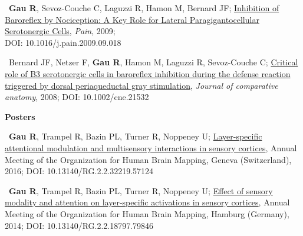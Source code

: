 \documentclass[a4paper,12pt,oneside]{letter}
\begin{document}
{\textbullet~\textbf{Gau R}, Sevoz-Couche C, Laguzzi R, Hamon M, Bernard JF; \href{http://www.researchgate.net/profile/Remi_Gau/publication/38057329_Inhibition_of_cardiac_baroreflex_by_noxious_thermal_stimuli_A_key_role_for_lateral_paragigantocellular_serotonergic_cells/links/586bf90d08ae8fce4919e188.pdf}{Inhibition of Baroreflex by Nociception: A Key Role for Lateral Paragigantocellular Serotonergic Cells}, \textit{Pain}, 2009; \\DOI: 10.1016/j.pain.2009.09.018

\textbullet~Bernard JF, Netzer F, \textbf{Gau R}, Hamon M, Laguzzi R, Sevoz-Couche C; 
\href{http://www.researchgate.net/profile/Remi_Gau/publication/5856955_Critical_role_of_B3_serotonergic_cells_in_baroreflex_inhibition_during_the_defense_reaction_triggered_by_dorsal_periaqueductal_gray_stimulation/links/586bf81d08ae6eb871bb6f47.pdf}{Critical role of B3 serotonergic cells in baroreflex inhibition during the defense reaction triggered by dorsal periaqueductal gray stimulation}, \textit{Journal of comparative anatomy}, 2008; DOI: 10.1002/cne.21532


\begin{center}
\Large\textbf{Posters}
\end{center}

\textbullet~\textbf{Gau R}, Trampel R, Bazin PL, Turner R, Noppeney U; \href{http://www.researchgate.net/profile/Remi_Gau/publication/312040907_Layer-specific_attentional_modulation_and_multisensory_interactions_in_sensory_cortices/links/586bec8108ae8fce4919e07e.pdf?origin=publication_detail&ev=pub_int_prw_xdl&msrp=ebfE-ttTbrYfVzAofje5aX7FDjiW85HC3yqk8seJjhsOoLqmeRviQBtfDuXmv_czDArKxDp2vM32swxlbQzyvbVTbKL6xRpsEZ-BeqgslOo.KWD8vv500DrprbLnXSrDxinWDQrliScdbic1rjyyqLUG12KOwbjri9jbFDwSYWMkGLoSocKyAei7eQLoDCU9Dw.4eQVGmpcVG-AAQDI4KiYt-xA9SDkF_u7xvWOznoi52trnfagq5aJVIAgpfhgitdzt3LYuUPdJ8gE6jmG5I94Nw}{Layer-specific attentional modulation and multisensory interactions in sensory cortices}, Annual Meeting of the Organization for Human Brain Mapping, Geneva (Switzerland), 2016; DOI: 10.13140/RG.2.2.32219.57124

\textbullet~\textbf{Gau R}, Trampel R, Bazin PL, Turner R, Noppeney U; \href{http://www.researchgate.net/profile/Remi_Gau/publication/312040995_Effect_of_sensory_modality_and_attention_on_layer-specific_activations_in_sensory_cortices/links/586bef4108ae329d621216ff.pdf?origin=publication_detail&ev=pub_int_prw_xdl&msrp=rWGQkC7vAu_P6H2YxCI3M31egmAPzpbXdoRN1OdTlFE2ytvRyytc2DItV2mPnvlGPXAOT-Q0hOx0cWKEfhvF_ZK7oOzQtXTOX1cxj1f7wdc.EjFU3lhxIUR_qptyNrCYqZDXVg6nG7zWe8VL0WxLSdSMUGnjz_v4L5Yov-RWctdEwDPFRXLasy1FBdCk7Dlydw.IANTdlTw5MPB88HQJNdTi7lFv6Sygddbknct3mMTSsgH20heYrYcKnbsQLxtcsNd-HHWZUEIEP4-7bkQLNDUhQ}{Effect of sensory modality and attention on layer-specific activations in sensory cortices}, Annual Meeting of the Organization for Human Brain Mapping, Hamburg (Germany), 2014; DOI: 10.13140/RG.2.2.18797.79846

}
\end{document}
